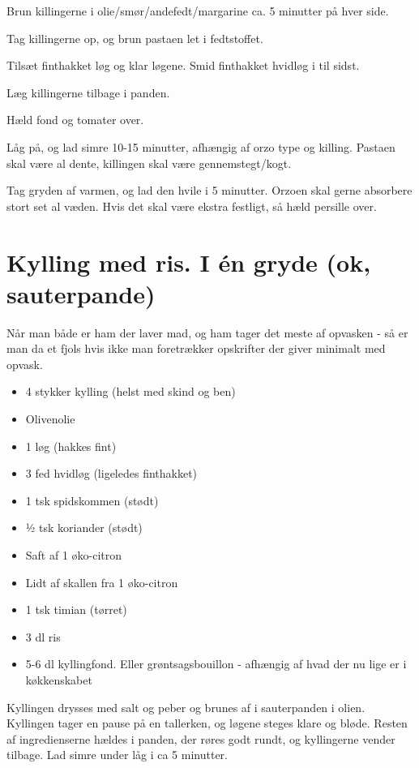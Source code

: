 \documentclass[
  letterpaper,
  DIV=11,
  numbers=noendperiod]{scrreprt}
\providecommand{\tightlist}{%
  \setlength{\itemsep}{0pt}\setlength{\parskip}{0pt}}\usepackage{longtable,booktabs,array}
\begin{document}
Brun killingerne i olie/smør/andefedt/margarine ca. 5 minutter på hver
side.

Tag killingerne op, og brun pastaen let i fedtstoffet.

Tilsæt finthakket løg og klar løgene. Smid finthakket hvidløg i til
sidst.

Læg killingerne tilbage i panden.

Hæld fond og tomater over.

Låg på, og lad simre 10-15 minutter, afhængig af orzo type og killing.
Pastaen skal være al dente, killingen skal være gennemstegt/kogt.

Tag gryden af varmen, og lad den hvile i 5 minutter. Orzoen skal gerne
absorbere stort set al væden. Hvis det skal være ekstra festligt, så
hæld persille over.

\hypertarget{kylling-med-ris.-i-uxe9n-gryde-ok-sauterpande}{%
\section{Kylling med ris. I én gryde (ok,
sauterpande)}\label{kylling-med-ris.-i-uxe9n-gryde-ok-sauterpande}}

Når man både er ham der laver mad, og ham tager det meste af opvasken -
så er man da et fjols hvis ikke man foretrækker opskrifter der giver
minimalt med opvask.

\begin{itemize}
\tightlist
\item
  4 stykker kylling (helst med skind og ben)
\item
  Olivenolie
\item
  1 løg (hakkes fint)
\item
  3 fed hvidløg (ligeledes finthakket)
\item
  1 tsk spidskommen (stødt)
\item
  ½ tsk koriander (stødt)
\item
  Saft af 1 øko-citron
\item
  Lidt af skallen fra 1 øko-citron
\item
  1 tsk timian (tørret)
\item
  3 dl ris
\item
  5-6 dl kyllingfond. Eller grøntsagsbouillon - afhængig af hvad der nu
  lige er i køkkenskabet
\end{itemize}

Kyllingen drysses med salt og peber og brunes af i sauterpanden i olien.
Kyllingen tager en pause på en tallerken, og løgene steges klare og
bløde. Resten af ingredienserne hældes i panden, der røres godt rundt,
og kyllingerne vender tilbage. Lad simre under låg i ca 5 minutter.
\end{document}
